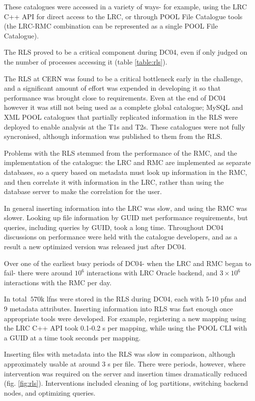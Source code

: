 \documentclass{cmspaper}
\begin{document}
These catalogues were accessed in a variety of ways- for example,
using the LRC C++ API for direct access to the LRC, or through POOL
File Catalogue tools (the LRC-RMC combination can be represented as a
single POOL File Catalogue).

The RLS proved to be a critical component during DC04, even if only
judged on the number of processes accessing it (table
\ref{table:rls}).

The RLS at CERN was found to be a critical bottleneck early in the
challenge, and a significant amount of effort was expended in
developing it so that performance was brought close to
requirements. Even at the end of DC04 however it was still not being
used as a complete global catalogue; MySQL and XML POOL catalogues that
partially replicated information in the RLS were deployed to enable
analysis at the T1s and T2s. These catalogues were not fully
syncronised, although information was published to them from the RLS.

Problems with the RLS stemmed from the performance of the RMC, and the
implementation of the catalogue: the LRC and RMC are implemented as
separate databases, so a query based on metadata must look up
information in the RMC, and then correlate it with information in the
LRC, rather than using the database server to make the correlation for
the user.

In general inserting information into the LRC was slow, and using the
RMC was slower. Looking up file information by GUID met performance
requirements, but queries, including queries by GUID, took a long
time. Throughout DC04 discussions on performance were held with the
catalogue developers, and as a result a new optimized version was
released just after DC04.

Over one of the earliest busy periods of DC04- when the LRC and RMC
began to fail- there were around $10^6$ interactions with LRC Oracle
backend, and $3\times10^6$ interactions with the RMC per day.

In total $~570$k lfns were stored in the RLS during DC04, each with
5-10 pfns and 9 metadata attributes. Inserting information into RLS
was fast enough once appropriate tools were developed. For example,
registering a new mapping using the LRC C++ API took 0.1-0.2 s per
mapping, while using the POOL CLI with a GUID at a time took seconds
per mapping.

Inserting files with metadata into the RLS was slow in comparison,
although approximately usable at around 3 s per file. There were
periods, however, where intervention was required on the server and
insertion times dramatically reduced
(fig. \ref{fig:rls}). Interventions included cleaning of log
partitions, switching backend nodes, and optimizing queries.
\end{document}
